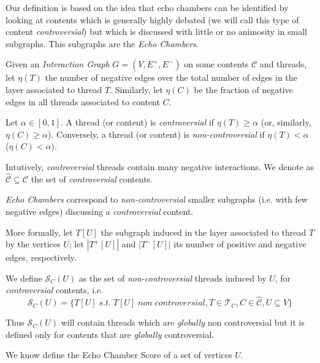 Our definition is based on the idea that echo chambers can be identified by
looking at contents which is generally highly debated (we will call
this type of content \emph{controversial}) but which is discussed with little
or no animosity in small subgraphs. This subgraphs are the \emph{Echo
	Chambers}.

\bigskip

Given an \emph{Interaction Graph} $G = (V, E^{+}, E^{-})$ on some contents
$\mathcal{C} $ and threads, let $\eta(T)$ the number of negative edges over the
total number of edges in the layer associated to thread $T$. Similarly,
let $\eta(C)$ be the fraction of negative edges in all threads associated to
content $C$.

\begin{definition}
	Let $\alpha \in [0,1]$. A thread (or content) is \emph{controversial} if
	$\eta(T) \geq \alpha$ (or, similarly, $\eta(C) \geq \alpha $). Conversely, a
	thread (or content) is \emph{non-controversial} if $\eta(T) < \alpha$ ($\eta(C) <
		\alpha$).
\end{definition}

Intutively, \emph{controversial} threads contain many negative
interactions. We denote as $\hat{\mathcal{C} } \subseteq \mathcal{C} $ the
set of \emph{controversial} contents.

\medskip

\emph{Echo Chambers} correspond to \emph{non-controversial} smaller subgraphs
(i.e. with few negative edges) discussing a
\emph{controversial} content.

More formally, let $T[U]$ the subgraph induced in the layer associated to
thread $T$ by the vertices $U$; let $|T^{+} [U]|$ and $|T^{-} [U]|$ its number
of positive and negative edges, respectively.

We define $\mathcal{S}_C (U)$ as the set of \emph{non-controversial} threads
induced by $U$, for \textit{controversial} contents, i.e.
	{\small
		\begin{equation}
			\mathcal{S} _{C} (U) = \{ T[U] \; s.t. \; T[U] \; non \;
			controversial, T \in \mathcal{T} _{C}, C
			\in \hat{\mathcal{C}}, U \subseteq V\}
		\end{equation}
	}

Thus $\mathcal{S} _C (U)$ will contain threads which are \emph{globally} non
controversial but it is defined only for contents that are \emph{globally}
controversial.

\medskip

We know define the Echo Chamber Score of a set of vertices $U$.

